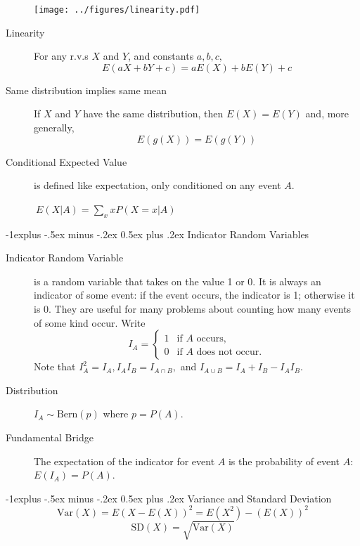 \documentclass[10pt,landscape]{article}
\makeatletter
\newcommand{\var}{\textrm{Var}}
\newcommand{\Bern}{\textrm{Bern}}
\renewcommand{\subsection}{\@startsection{subsection}{2}{0mm}%
                                {-1explus -.5ex minus -.2ex}%
                                {0.5ex plus .2ex}%
                                {\normalfont\normalsize\bfseries}}
\makeatother
\begin{document}
\begin{multicols*}{3}
\begin{description}
        \begin{minipage}{\linewidth}
            \centering
            \texttt{[image: ../figures/linearity.pdf]}
        \end{minipage}
        
        \item[Linearity] For any r.v.s $X$ and $Y$, and constants $a,b,c,$ 
        \[E(aX + bY + c) = aE(X) + bE(Y) + c \]
                        
        \item[Same distribution implies same mean] If $X$ and $Y$ have the same distribution, then $E(X)=E(Y)$ and, more generally, 
        $$E(g(X)) = E(g(Y))$$
                        
        \item[Conditional Expected Value] is defined like expectation, only conditioned on any event $A$. \begin{center}
        $\ E(X | A) = \sum\limits_{x}xP(X=x | A)$
        \end{center}
    \end{description}
            
    \subsection{Indicator Random Variables}
    \begin{description}
        \item[Indicator Random Variable] is a random variable that takes on the value 1 or 0. It is always an indicator of some event: if the event occurs, the indicator is 1; otherwise it is 0. They are useful for many problems about counting how many events of some kind occur. Write \[
        I_A =
        \begin{cases}
            1 & \text{if $A$ occurs,}         \\
            0 & \text{if $A$ does not occur.} 
        \end{cases}
    \]
    Note that $I_A^2 = I_A, I_A I_B = I_{A \cap B}, $ and $I_{A \cup B} = I_A + I_B - I_A I_B$. 
    \item[Distribution] $I_A \sim \Bern(p)$ where $p = P(A)$.
    \item[Fundamental Bridge] The expectation of the indicator for event $A$ is the probability of event $A$: $E(I_A) = P(A)$. 
    \end{description}
            
    \subsection{Variance and Standard Deviation}
    \[\var(X) = E \left(X - E(X)\right)^2 = E(X^2) - (E(X))^2\]
    \[\textrm{SD}(X) = \sqrt{\var(X)}\]
            

\end{multicols*}
\end{document}
